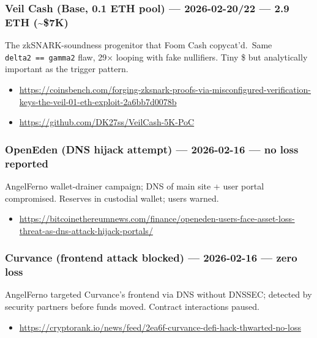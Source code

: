 \subsubsection{Veil Cash (Base, 0.1 ETH pool) --- 2026-02-20/22 --- 2.9 ETH (\textasciitilde\$7K)}\label{veil-cash-base-0.1-eth-pool-2026-02-2022-2.9-eth-7k}

The zkSNARK-soundness progenitor that Foom Cash copycat'd.~Same \texttt{delta2\ ==\ gamma2} flaw, 29× looping with fake nullifiers. Tiny \$ but analytically important as the trigger pattern.

\begin{itemize}
\tightlist
\item
  \url{https://coinsbench.com/forging-zksnark-proofs-via-misconfigured-verification-keys-the-veil-01-eth-exploit-2a6bb7d0078b}
\item
  \url{https://github.com/DK27ss/VeilCash-5K-PoC}
\end{itemize}

\subsubsection{OpenEden (DNS hijack attempt) --- 2026-02-16 --- no loss reported}\label{openeden-dns-hijack-attempt-2026-02-16-no-loss-reported}

AngelFerno wallet-drainer campaign; DNS of main site + user portal compromised. Reserves in custodial wallet; users warned.

\begin{itemize}
\tightlist
\item
  \url{https://bitcoinethereumnews.com/finance/openeden-users-face-asset-loss-threat-as-dns-attack-hijack-portals/}
\end{itemize}

\subsubsection{Curvance (frontend attack blocked) --- 2026-02-16 --- zero loss}\label{curvance-frontend-attack-blocked-2026-02-16-zero-loss}

AngelFerno targeted Curvance's frontend via DNS without DNSSEC; detected by security partners before funds moved. Contract interactions paused.

\begin{itemize}
\tightlist
\item
  \url{https://cryptorank.io/news/feed/2ea6f-curvance-defi-hack-thwarted-no-loss}
\end{itemize}

